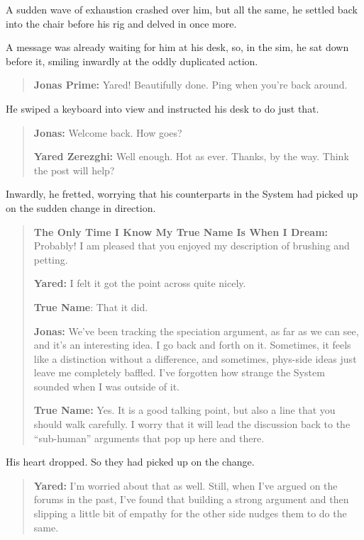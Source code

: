 A sudden wave of exhaustion crashed over him, but all the same, he settled back into the chair before his rig and delved in once more.

A message was already waiting for him at his desk, so, in the sim, he sat down before it, smiling inwardly at the oddly duplicated action.

\begin{quote}
\textbf{Jonas Prime:} Yared! Beautifully done. Ping when you're back around.
\end{quote}

He swiped a keyboard into view and instructed his desk to do just that.

\begin{quote}
\textbf{Jonas:} Welcome back. How goes?

\textbf{Yared Zerezghi:} Well enough. Hot as ever. Thanks, by the way. Think the post will help?
\end{quote}

Inwardly, he fretted, worrying that his counterparts in the System had picked up on the sudden change in direction.

\begin{quote}
\textbf{The Only Time I Know My True Name Is When I Dream:} Probably! I am pleased that you enjoyed my description of brushing and petting.

\textbf{Yared:} I felt it got the point across quite nicely.

\textbf{True Name}: That it did.

\textbf{Jonas:} We've been tracking the speciation argument, as far as we can see, and it's an interesting idea. I go back and forth on it. Sometimes, it feels like a distinction without a difference, and sometimes, phys-side ideas just leave me completely baffled. I've forgotten how strange the System sounded when I was outside of it.

\textbf{True Name:} Yes. It is a good talking point, but also a line that you should walk carefully. I worry that it will lead the discussion back to the ``sub-human'' arguments that pop up here and there.
\end{quote}

His heart dropped. So they had picked up on the change.

\begin{quote}
\textbf{Yared:} I'm worried about that as well. Still, when I've argued on the forums in the past, I've found that building a strong argument and then slipping a little bit of empathy for the other side nudges them to do the same.
\end{quote}

